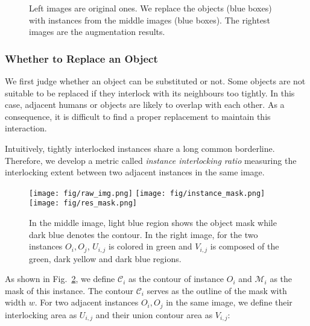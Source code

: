 \documentclass[10pt,twocolumn,letterpaper]{article}
\begin{document}
\begin{figure}[tb!]
\centering
{}
\caption{Left images are original ones. We replace the objects (blue boxes) with instances from the middle images (blue boxes). The rightest images are the augmentation results.}
\label{fig:object exchange}
\end{figure}

\subsubsection{Whether to Replace an Object}
We first judge whether an object can be substituted or not. Some objects are not suitable to be replaced if they interlock with its neighbours too tightly. In this case, adjacent humans or objects are likely to overlap with each other. As a consequence, it is difficult to find a proper replacement to maintain this interaction.

Intuitively, tightly interlocked instances share a long common borderline. Therefore, we develop a metric called \textit{instance interlocking ratio} measuring the interlocking extent between two adjacent instances in the same image.

\begin{figure}[tb!]
\centering
\texttt{[image: fig/raw\_img.png]}
\texttt{[image: fig/instance\_mask.png]}
\texttt{[image: fig/res\_mask.png]}
\caption{In the middle image, light blue region shows the object mask while dark blue denotes the contour. In the right image, for the two instances $O_i,O_j$, $U_{i,j}$ is colored in green and $V_{i,j}$ is composed of the green, dark yellow and dark blue regions.}
\label{fig:contour_mask}
\end{figure}

As shown in Fig.~\ref{fig:contour_mask}, we define $\mathcal{C}_i$ as the contour of instance $O_i$ and $\mathcal{M}_i$ as the mask of this instance. The contour $\mathcal{C}_i$ serves as the outline of the mask with width $w$. For two adjacent instances $O_i,O_j$ in the same image, we define their interlocking area as $U_{i,j}$ and their union contour area as $V_{i,j}$:
\end{document}
